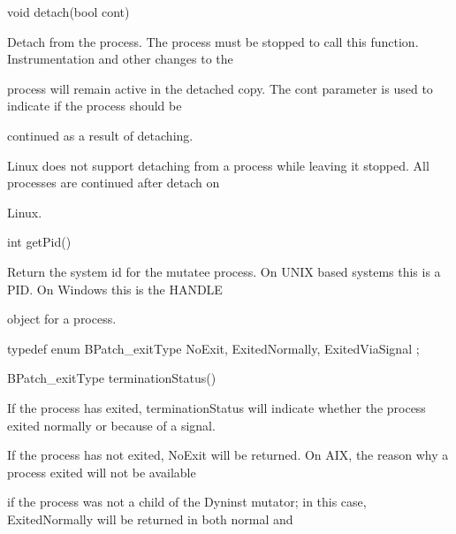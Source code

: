 {{{{{{{\bigskip



{

void detach(bool cont)}



{

Detach from the process. The process must be stopped to call this function. Instrumentation and other changes to the

process will remain active in the detached copy. The cont parameter is used to indicate if the process should be

continued as a result of detaching.



{

Linux does not support detaching from a process while leaving it stopped. All processes are continued after detach on

Linux.}



{

int getPid()}



{

Return the system id for the mutatee process. On UNIX based systems this is a PID. On Windows this is the HANDLE

object for a process.}





\bigskip



{

typedef enum BPatch_exitType { NoExit, ExitedNormally, ExitedViaSignal };}





\bigskip



{

BPatch_exitType terminationStatus()}



{

If the process has exited, terminationStatus will indicate whether the process exited normally or because of a signal.

If the process has not exited, NoExit will be returned. On AIX, the reason why a process exited will not be available

if the process was not a child of the Dyninst mutator; in this case, ExitedNormally will be returned in both normal and

}}}}}}}}}
